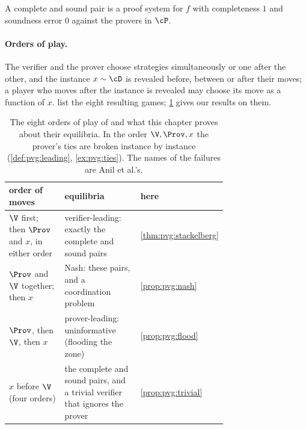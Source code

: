 \begin{refsection}
A complete and sound pair is a proof system for $f$ with completeness $1$ and soundness error $0$ against the provers in $\cP$.

\paragraph{Orders of play.} The verifier and the prover choose strategies simultaneously or one after the other, and the instance $x\sim\cD$ is revealed before, between or after their moves; a player who moves after the instance is revealed may choose its move as a function of $x$. \Textcite[Table~1]{AnilEtAl2021} list the eight resulting games; \cref{tab:pvg:orders} gives our results on them.

\begin{table}[t]
\centering\small
\begin{tabular}{@{}>{\raggedright\arraybackslash}p{0.31\linewidth}>{\raggedright\arraybackslash}p{0.41\linewidth}l@{}}
\toprule
order of moves & equilibria & here\\
\midrule
$\V$ first; then $\Prov$ and $x$, in either order & verifier-leading: exactly the complete and sound pairs & \cref{thm:pvg:stackelberg}\\
$\Prov$ and $\V$ together; then $x$ & Nash: these pairs, and a coordination problem & \cref{prop:pvg:nash}\\
$\Prov$, then $\V$, then $x$ & prover-leading: uninformative (flooding the zone) & \cref{prop:pvg:flood}\\
$x$ before $\V$ (four orders) & the complete and sound pairs, and a trivial verifier that ignores the prover & \cref{prop:pvg:trivial}\\
\bottomrule
\end{tabular}
\caption{The eight orders of play of \textcite[Table~1]{AnilEtAl2021} and what this chapter proves about their equilibria. In the order $\V,\Prov,x$ the prover's ties are broken instance by instance (\cref{def:pvg:leading}, \cref{ex:pvg:ties}). The names of the failures are Anil et al.'s.}\label{tab:pvg:orders}
\end{table}



\end{refsection}
